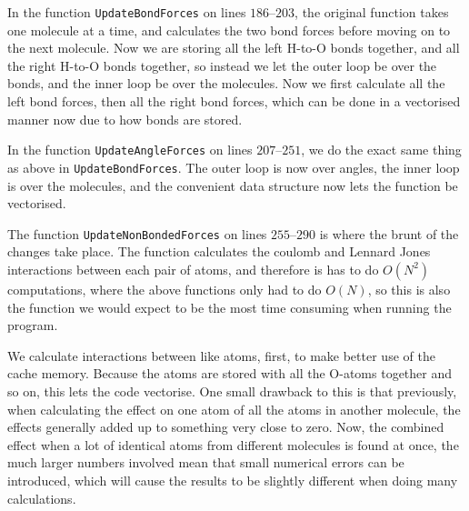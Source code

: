 \documentclass{article}
\begin{document}
In the function \texttt{UpdateBondForces} on lines $186$--$203$, the original function takes one molecule at a time, and calculates the two bond forces before moving on to the next molecule. Now we are storing all the left H-to-O bonds together, and all the right H-to-O bonds together, so instead we let the outer loop be over the bonds, and the inner loop be over the molecules. Now we first calculate all the left bond forces, then all the right bond forces, which can be done in a vectorised manner now due to how bonds are stored.

In the function \texttt{UpdateAngleForces} on lines $207$--$251$, we do the exact same thing as above in \texttt{UpdateBondForces}. The outer loop is now over angles, the inner loop is over the molecules, and the convenient data structure now lets the function be vectorised.

The function \texttt{UpdateNonBondedForces} on lines $255$--$290$ is where the brunt of the changes take place. The function calculates the coulomb and Lennard Jones interactions between each pair of atoms, and therefore is has to do $O(N^2)$ computations,  where the above functions only had to do $O(N)$, so this is also the function we would expect to be the most time consuming when running the program.


We calculate interactions between like atoms, first, to make better use of the cache memory. Because the atoms are stored with all the O-atoms together and so on, this lets the code vectorise. One small drawback to this is that previously, when calculating the effect on one atom of all the atoms in another molecule, the effects generally added up to something very close to zero. Now, the combined effect when a lot of identical atoms from different molecules is found at once, the much larger numbers involved mean that small numerical errors can be introduced, which will cause the results to be slightly different when doing many calculations.
\end{document}
